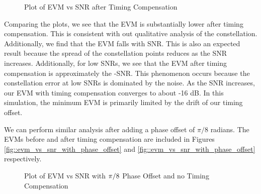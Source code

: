 \documentclass{article}
\begin{document}
\begin{figure}[H]
	\centerline{}
	\caption{Plot of EVM vs SNR after Timing Compensation}
	\label{fig::evm_vs_snr}
\end{figure}

Comparing the plots, we see that the EVM is substantially lower after timing compensation. This is consistent with out qualitative analysis of the constellation. Additionally, we find that the EVM falls with SNR. This is also an expected result because the spread of the constellation points reduces as the SNR increases. Additionally, for low SNRs, we see that the EVM after timing compensation is approximately the -SNR. This phenomenon occurs because the constellation error at low SNRs is dominated by the noise. As the SNR increases, our EVM with timing compensation converges to about -16 dB. In this simulation, the minimum EVM is primarily limited by the drift of our timing offset.

	We can perform similar analysis after adding a phase offset of $\pi/8$ radians. The EVMs before and after timing compensation are included in Figures \ref{fig::evm_vs_snr_with_phase_offset} and \ref{fig::evm_vs_snr_with_phase_offset} respectively.

\begin{figure}[H]
	\centerline{}
	\caption{Plot of EVM vs SNR with $\protect\pi/8$ Phase Offset and no Timing Compensation}
	\label{fig::evm_vs_snr_with_phase_offset_no_comp}
\end{figure}
\end{document}
